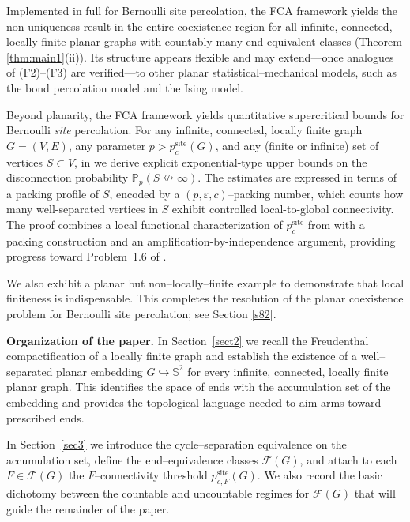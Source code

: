 \documentclass[11pt]{amsart}
\theoremstyle{plain}
\numberwithin{equation}{section}
\numberwithin{figure}{section}
\begin{document}
\noindent
Implemented in full for Bernoulli site percolation, the FCA framework yields the non-uniqueness result in the entire coexistence region for all infinite, connected, locally finite planar graphs  with countably many end equivalent classes (Theorem \ref{thm:main1}(ii)). Its structure appears flexible and may extend—once analogues of \textup{(F2)}–\textup{(F3)} are verified—to other planar statistical–mechanical models, such as the bond percolation model and the Ising model.

Beyond planarity, the FCA framework yields quantitative supercritical bounds for Bernoulli
\emph{site} percolation.
For any infinite, connected, locally finite graph $G=(V,E)$, any parameter $p>p^{\mathrm{site}}_{c}(G)$,
and any (finite or infinite) set of vertices $S\subset V$, in \cite{ZL262} we derive explicit exponential-type
upper bounds on the disconnection probability $\mathbb{P}_{p}(S\nleftrightarrow\infty)$.
The estimates are expressed in terms of a packing profile of $S$, encoded by a
$(p,\varepsilon,c)$--packing number,  which counts how many well-separated vertices in $S$
exhibit controlled local-to-global connectivity.
The proof combines a local functional characterization of $p^{\mathrm{site}}_{c}$ from \cite{ZL24}
with a packing construction and an amplification-by-independence argument, providing
progress toward Problem~1.6 of \cite{DC20}.


\medskip
We also exhibit a planar but non–locally–finite example
to demonstrate that local finiteness is indispensable.
This completes the resolution of the planar coexistence problem
for Bernoulli site percolation; see Section \ref{s82}.









\medskip
\noindent\textbf{Organization of the paper.}
In Section~\ref{sect2} we recall the Freudenthal compactification of a locally finite graph
and establish the existence of a well--separated planar embedding $G\hookrightarrow\mathbb S^2$
for every infinite, connected, locally finite planar graph.  This identifies the space of ends
with the accumulation set of the embedding and provides the topological language needed
to aim arms toward prescribed ends.

In Section~\ref{sec3} we introduce the cycle--separation equivalence on the accumulation set,
define the end--equivalence classes $\mathcal F(G)$, and attach to each $F\in\mathcal F(G)$ the
$F$--connectivity threshold $p^{\mathrm{site}}_{c,F}(G)$.  We also record the basic dichotomy between
the countable and uncountable regimes for $\mathcal F(G)$ that will guide the remainder of the paper.
\end{document}

